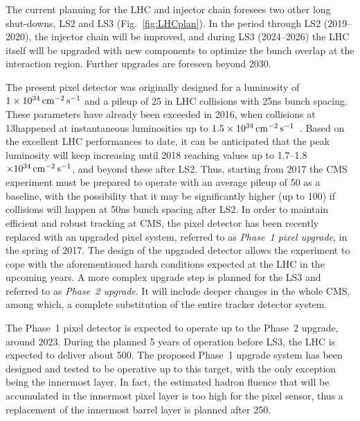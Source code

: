 The current planning for the LHC and injector chain foresees two other long shut-downs, LS2 and LS3 (Fig.~\ref{fig:LHCplan}).
In the period through LS2 (2019--2020), the injector chain will be improved,
and during LS3 (2024--2026) the LHC itself will be upgraded with new components to optimize the bunch overlap at the interaction region. 
Further upgrades are foreseen beyond 2030.

The present pixel detector was originally designed for a luminosity of $1\times10^{34}\,\text{cm}^\text{$-$2}\,\text{s}^\text{$-$1}$ and a pileup of 25 in LHC collisions with 25\unit{ns} bunch spacing.
These parameters have already been exceeded in 2016, when collisions at 13\TeV happened at instantaneous luminosities up to $1.5\times10^{34}\,\text{cm}^\text{$-$2}\,\text{s}^\text{$-$1}$~\cite{LumiPublicResults}.
Based on the excellent LHC performances to date, it can be anticipated that the peak luminosity will keep increasing until 2018 reaching values up to 1.7--1.8$\times10^{34}\,\text{cm}^\text{$-$2}\,\text{s}^\text{$-$1}$, and beyond these after LS2.
Thus, starting from 2017 the CMS experiment must be prepared to operate with an average pileup of 50 as a baseline,
with the possibility that it may be significantly higher (up to 100) if collisions will happen at 50\unit{ns} bunch spacing after LS2.
In order to maintain efficient and robust tracking at CMS, the pixel detector has been recently replaced with an upgraded pixel system, referred to as {\it Phase~1 pixel upgrade}, in the spring of 2017.
The design of the upgraded detector allows the experiment to cope with the aforementioned harsh conditions expected at the LHC in the upcoming years.
A more complex upgrade step is planned for the LS3 and referred to as {\it Phase~2 upgrade}. It will include deeper changes in the whole CMS, among which, a complete substitution of the entire tracker detector system.

The Phase~1 pixel detector is expected to operate up to the Phase~2 upgrade, around 2023.
During the planned 5 years of operation before LS3, the LHC is expected to deliver about 500\fbinv.
The proposed Phase~1 upgrade system has been designed and tested to be operative up to this target, with the only exception being the innermost layer.
In fact, the estimated hadron fluence that will be accumulated in the innermost pixel layer is too high for the pixel sensor, thus a replacement of the innermost barrel layer is planned after 250\fbinv.

